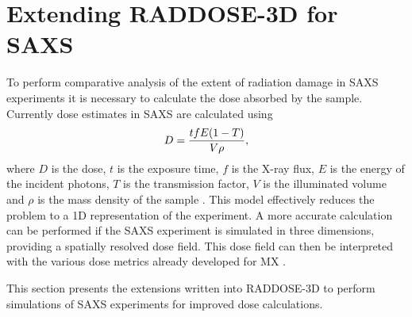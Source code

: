 \section{Extending RADDOSE-3D for SAXS}
\label{sec:Extending RADDOSE-3D for SAXS}
To perform comparative analysis of the extent of radiation damage in SAXS experiments it is necessary to calculate the dose absorbed by the sample.
Currently dose estimates in SAXS are calculated using
\begin{equation}
    D = \frac{tfE(1-T)}{V\rho},
\end{equation}
where $D$ is the dose, $t$ is the exposure time, $f$ is the X-ray flux, $E$ is the energy of the incident photons, $T$ is the transmission factor, $V$ is the illuminated volume and $\rho$ is the mass density of the sample \cite{meisburger2013breaking,jeffries2015limiting}.
This model effectively reduces the problem to a 1D representation of the experiment.
A more accurate calculation can be performed if the SAXS experiment is simulated in three dimensions, providing a spatially resolved dose field.
This dose field can then be interpreted with the various dose metrics already developed for MX \cite{zeldin2013dwd,zeldin2012}.

This section presents the extensions written into RADDOSE-3D to perform simulations of SAXS experiments for improved dose calculations.

